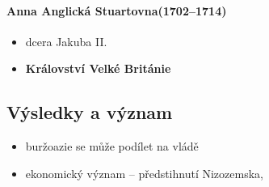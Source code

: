 \paragraph{Anna Anglická Stuartovna(1702--1714)}
\begin{itemize}
\item dcera Jakuba II.
\item {} \ra \textbf{Království Velké Británie}
\end{itemize}

\subsection{Výsledky a význam}
\begin{itemize}
\item buržoazie se může podílet na vládě
\item ekonomický význam -- předstihnutí Nizozemska, 
\end{itemize}

\newpage
